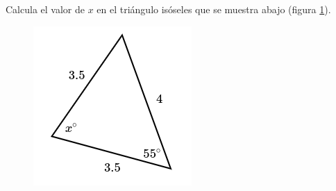 Calcula el valor de $x$ en el triángulo isóseles  que se muestra abajo (figura \ref{fig:findangle05}).

\begin{minipage}[t][][t]{0.35\textwidth}
    \begin{figure}[H]
        \centering
        \includegraphics[width=0.9\linewidth]{../images/findangle05.png}
        \caption{}
        \label{fig:findangle05}
    \end{figure}
\end{minipage}\hfill
